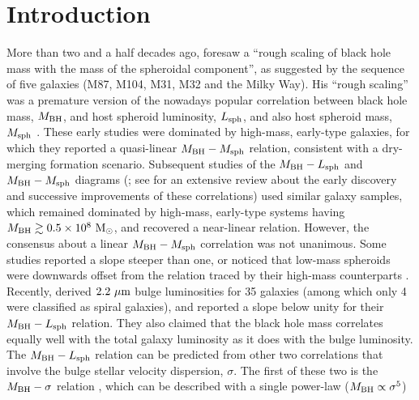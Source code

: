 \documentclass[preprint2]{emulateapj}
\begin{document}

\section{Introduction}
\label{sec:int}
More than two and a half decades ago, 
\cite{dressler1989} foresaw a ``rough scaling of black hole mass with the mass of the spheroidal component'', 
as suggested by the sequence of five galaxies (M87, M104, M31, M32 and the Milky Way). 
His ``rough scaling'' was a premature version of the nowadays popular correlation between black hole mass, $M_{\rm BH}$,  
and host spheroid luminosity, $L_{\rm sph}$, and also host spheroid mass, $M_{\rm sph}$ 
\citep{yee1992,kormendyrichstone1995,magorrian1998,marconihunt2003,haringrix2004}. 
These early studies were dominated by high-mass, early-type galaxies, 
for which they reported a quasi-linear $M_{\rm BH} - M_{\rm sph}$ relation, 
consistent with a dry-merging formation scenario. 
Subsequent studies of the $M_{\rm BH} - L_{\rm sph}$ and $M_{\rm BH} - M_{\rm sph}$ diagrams 
(\citealt{ferrareseford2005,lauer2007,graham2007,graham2008bar,gultelkin2009,sani2011,beifiori2012,erwingadotti2012,
vika2012,vandenbosch2012,mcconnellma2013,kormendyho2013,rusli2013}; 
see \citealt{graham2015bulges} for an extensive review about the early discovery and successive improvements of these correlations)
used similar galaxy samples, which remained dominated by high-mass, early-type systems having $M_{\rm BH} \gtrsim 0.5 \times 10^8~\rm M_\odot$, 
and recovered a near-linear relation. 
However, the consensus about a linear $M_{\rm BH} - M_{\rm sph}$ correlation was not unanimous. 
Some studies reported a slope steeper than one,  
or noticed that low-mass spheroids were downwards offset from the relation traced by their high-mass counterparts 
\citep{laor1998,wandel1999,laor2001,ryan2007}.
Recently, \cite{lasker2014data,lasker2014anal} derived $2.2~\rm \mu m$ bulge luminosities for 35 galaxies 
(among which only 4 were classified as spiral galaxies), 
and reported a slope below unity for their $M_{\rm BH} - L_{\rm sph}$ relation. 
They also claimed that the black hole mass correlates equally well with the total galaxy luminosity 
as it does with the bulge luminosity. \\
The $M_{\rm BH} - L_{\rm sph}$ relation can be predicted from other two correlations that involve 
the bulge stellar velocity dispersion, $\sigma$.
The first of these two is the $M_{\rm BH} - \sigma$ relation \citep{ferraresemerritt2000,gebhardt2000},
which can be described with a single power-law ($M_{\rm BH} \propto \sigma^5$) 
\end{document}
